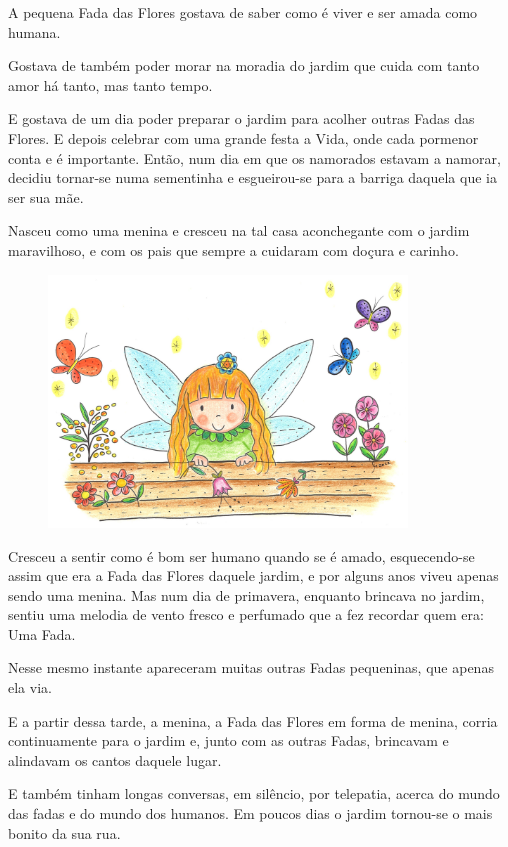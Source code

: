\documentclass[12pt, a4paper, twoside]{memoir}
\begin{document}
A pequena Fada das Flores gostava de saber como é viver e ser amada como humana.

Gostava de também poder morar na moradia do jardim que cuida com tanto amor há tanto, mas tanto tempo.

E gostava de um dia poder preparar o jardim para acolher outras Fadas das Flores. E depois celebrar com uma grande festa a Vida, onde cada pormenor conta e é importante.
\bigbreak
Então, num dia em que os namorados estavam a namorar, decidiu tornar-se numa sementinha e esgueirou-se para a barriga daquela que ia ser sua mãe.

Nasceu como uma menina e cresceu na tal casa aconchegante com o jardim maravilhoso, e com os pais que sempre a cuidaram com doçura e carinho.

\begin{figure}[h]
    \centering
    \includegraphics[width=0.85\textwidth]{no_deque}
\end{figure}

Cresceu a sentir como é bom ser humano quando se é amado, esquecendo-se assim que era a Fada das Flores daquele jardim, e por alguns anos viveu apenas sendo uma menina.
\bigbreak
Mas num dia de primavera, enquanto brincava no jardim, sentiu uma melodia de vento fresco e perfumado que a fez recordar quem era: Uma Fada.

Nesse mesmo instante apareceram muitas outras Fadas pequeninas, que apenas ela via.

E a partir dessa tarde, a menina, a Fada das Flores em forma de menina, corria continuamente para o jardim e, junto com as outras Fadas, brincavam e alindavam os cantos daquele lugar.

E também tinham longas conversas, em silêncio, por telepatia, acerca do mundo das fadas e do mundo dos humanos.
\bigbreak
Em poucos dias o jardim tornou-se o mais bonito da sua rua.
\end{document}
